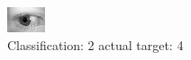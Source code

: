 \begin{figure}[h!]
\begin{center}
\includegraphics[width=0.60\columnwidth]{figures/ID789_class_2_target_4.png}
\end{center}
\caption{ Classification: 2 actual target: 4}
\label{fig:ID789_class_2_target_4}
\end{figure}
